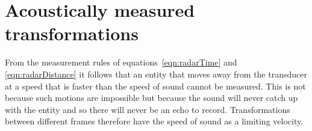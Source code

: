 





\section{Acoustically measured transformations}




From the measurement rules of equations~\ref{eqn:radarTime} and \ref{eqn:radarDistance}
it follows that an entity that moves away from the transducer at a speed that is faster than the speed of sound cannot be measured.  
This is not because such motions are impossible but because the sound will never catch  up with the entity and so there will never be an echo to record.
Transformations between different frames therefore have the speed of sound as a limiting velocity.

